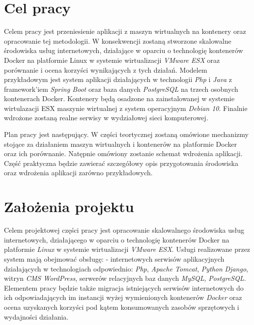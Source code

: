 \documentclass[polish, a4paper, 12pt, oneside]{book}
\begin{document}
\section{Cel pracy}
Celem pracy jest przeniesienie aplikacji z maszyn wirtualnych na kontenery oraz opracowanie tej metodologii. W konsekwencji zostaną stworzone skalowalne środowiska usług internetowych, działające w oparciu o technologię kontenerów Docker na platformie Linux w systemie wirtualizacji \textit{VMware ESX}\cite{vmwareesx} oraz porównanie i ocena korzyści wynikających z tych działań. Modelem przykładowym jest system aplikacji działających w technologii \textit{Php}\cite{php} i \textit{Java}\cite{java} z framework'iem \textit{Spring Boot}\cite{springboot} oraz baza danych \textit{PostgreSQL}\cite{postgresql} na trzech osobnych kontenerach Docker. Kontenery będą osadzone na zainstalowanej w systemie wirtulazacji ESX maszynie wirtualnej z system operacyjnym \textit{Debian 10}\cite{debian10}. Finalnie wdrożone zostaną realne serwisy w wydziałowej sieci komputerowej.

Plan pracy jest następujący. W części teortycznej zostaną omówione mechanizmy stojące za działaniem maszyn wirtualnych i kontenerów na platformie Docker oraz ich porównanie. Natępnie omówiony zostanie schemat wdrożenia aplikacji. Część praktyczna będzie zawierać szczegółowy opis przygotowania środowiska oraz wdrożenia aplikacji zarówno przykładowych. 

\section{Założenia projektu}
Celem projektowej części pracy jest opracowanie skalowalnego środowiska usług internetowych, działającego w oparciu o technologię kontenerów Docker na platformie \textit{Linux} w systemie wirtualizacji \textit{VMware ESX}\cite{vmwareesx}. Usługi realizowane przez system mają obejmować obsługę: - internetowych serwisów aplikacyjnych działających w technologiach odpowiednio: \textit{Php}\cite{php}, \textit{Apache Tomcat}\cite{apachetomcat}, \textit{Python}\cite{python} \textit{Django}\cite{django}, witryn \textit{CMS WordPress}\cite{wordpress}, serwerów relacyjnych baz danych \textit{MySQL}\cite{mysql}, \textit{PostgreSQL}\cite{postgresql}. Elementem pracy będzie także migracja istniejących serwisów internetowych do ich odpowiadających im instancji wyżej wymienionych kontenerów \textit{Docker}\cite{docker} oraz ocena uzyskanych korzyści pod kątem konsumowanych zasobów sprzętowych i wydajności działania. 
\end{document}
